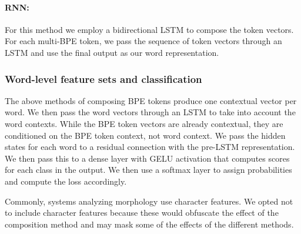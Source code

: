 \documentclass[11pt]{article}
\begin{document}
	
     \paragraph{RNN:} For this method we employ a bidirectional
     LSTM to compose the token vectors. For each multi-BPE token, we
     pass the sequence of token vectors through an LSTM and use the
     final output as our word representation.

     \subsubsection{Word-level feature sets and classification}


    The above methods of composing BPE tokens produce one contextual
    vector per word.  We then pass the word vectors through an LSTM
    to take into account the word contexts.  While the BPE token
    vectors are already contextual, they are conditioned on the BPE
    token context, not word context.  We pass the hidden states for
    each word to a residual connection with the pre-LSTM
    representation. We then pass this to a dense layer with GELU
    activation that computes scores for each class in the output. We
    then use a softmax layer to assign probabilities and compute the
    loss accordingly.

    Commonly, systems analyzing morphology use character features. We
    opted not to include character features because these would
    obfuscate the effect of the composition method and may mask some
    of the effects of the different methods.
    
\end{document}
